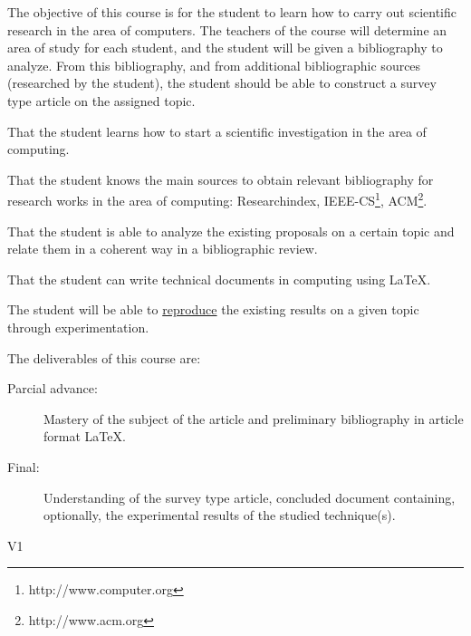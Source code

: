 \begin{syllabus}


\begin{justification}
  The objective of this course is for the student to learn how to carry out scientific research in the area of computers. The teachers of the course will determine an area of study for each student, and the student will be given a bibliography to analyze. From this bibliography, and from additional bibliographic sources (researched by the student), the student should be able to construct a survey type article on the assigned topic.
\end{justification}

\begin{goals}
\item That the student learns how to start a scientific investigation in the area of computing.
\item That the student knows the main sources to obtain relevant bibliography for research works in the area of computing: Researchindex, IEEE-CS\footnote{http://www.computer.org}, ACM\footnote{http://www.acm.org}.
\item That the student is able to analyze the existing proposals on a certain topic and relate them in a coherent way in a bibliographic review.
\item That the student can write technical documents in computing using \LaTeX.
\item The student will be able to \underline{reproduce} the existing results on a given topic through experimentation.
\item The deliverables of this course are:
	\begin{description}
	\item [Parcial advance:] Mastery of the subject of the article and preliminary bibliography in article format \LaTeX.
	\item [Final:] Understanding of the survey type article, concluded document containing, optionally, the experimental results of the studied technique(s).
	\end{description}
\end{goals}

\begin{outcomes}{V1}
    \item {}
    \item {}
    \item {}
    \item {}
    \item {}
    \item {}
    \item {}
    \item {}
    \item {}
    \item {}
    \item {}
\end{outcomes}


\end{syllabus}
